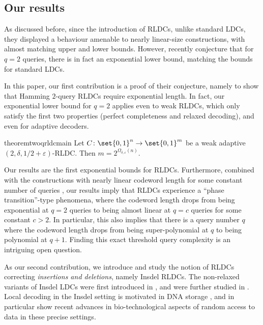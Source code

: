 \documentclass[10pt,a4paper]{article}
\theoremstyle{remark}
\newcommand{\eps}{\ensuremath{\varepsilon}}
\newcommand{\authnote}[3]{\textcolor{#2}{{\sf (#1's Note: {\sl{#3}})}}}
\newcommand{\enote}{\authnote{Elena}{green}}
\newcommand{\authnote}{}
\newcommand{\enote}[1]{}
\begin{document}
\subsection{Our results}

As discussed before, since the introduction of RLDCs, unlike standard LDCs, they displayed a behaviour amenable to nearly linear-size constructions, with almost matching upper and lower bounds. However, recently \cite{GurL21} conjecture that for $q=2$ queries, there is in fact an exponential lower bound, matching the bounds for standard LDCs. 
 
In this paper, our first contribution is a proof of their conjecture, namely to show that Hamming $2$-query RLDCs  require exponential length. In fact, our exponential lower bound for $q=2$ applies even to weak RLDCs, which only satisfy the first two properties (perfect completeness and relaxed decoding), and even for adaptive decoders. 



\begin{restatable}{theorem}{twoqrldcmain} \label{thm:main-2qRLDC}
	Let $C \colon \set{0,1}^n \rightarrow \set{0,1}^m$ be a weak adaptive $(2,\delta,1/2+\eps)$-RLDC. Then $m = 2^{\Omega_{\delta,\eps}(n)}$.
\end{restatable}

Our results are the first exponential bounds for RLDCs. Furthermore, combined with the constructions with nearly linear codeword length for some constant number of queries \cite{Ben-SassonGHSV06, AsadiS21}, our results imply that RLDCs experience a ``phase transition''-type phenomena, where the codeword length drops from being exponential at $q=2$ queries to being almost linear at $q=c$ queries for some constant $c> 2$. In particular, this also implies that there is a query number $q$ where the codeword length drops from being super-polynomial at $q$ to being polynomial at $q+1$. Finding this exact threshold query complexity is an intriguing open question.    




As our second contribution, we introduce and study the notion of RLDCs  correcting {\em insertions and deletions}, namely  Insdel RLDCs. 
The non-relaxed variants of Insdel LDCs  were first introduced in \cite{Ostrovsky-InsdelLDC-Compiler}, and were further studied in \cite{BlockBGKZ20,ChengLZ20,block2021private}. Local decoding in the Insdel setting is  motivated in DNA storage \cite{Olgica17}, and in particular  \cite{Banaletal-nature2021} show recent advances in bio-technological aspects of random access to data in these precise settings.
\end{document}
